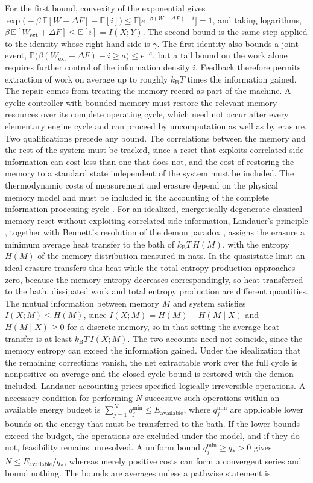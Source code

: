 \documentclass[11pt]{article}
\theoremstyle{definition}
\theoremstyle{remark}
\newcommand{\E}{\mathbb{E}}
\renewcommand{\Pr}{\mathbb{P}}
\newcommand{\kB}{k_{\mathrm B}}
\begin{document}
For the first bound, convexity of the exponential gives $\exp\big(-\beta\,\E[W - \Delta F] - \E[i]\big) \le \E\big[e^{-\beta (W - \Delta F) - i}\big] = 1$, and taking logarithms, $\beta\,\E[W_{\mathrm{ext}} + \Delta F] \le \E[i] = I(X;Y)$. The second bound is the same step applied to the identity whose right-hand side is $\gamma$. The first identity also bounds a joint event, $\Pr\big(\beta (W_{\mathrm{ext}} + \Delta F) - i \ge a\big) \le e^{-a}$, but a tail bound on the work alone requires further control of the information density $i$. Feedback therefore permits extraction of work on average up to roughly $\kB T$ times the information gained. The repair comes from treating the memory record as part of the machine. A cyclic controller with bounded memory must restore the relevant memory resources over its complete operating cycle, which need not occur after every elementary engine cycle and can proceed by uncomputation as well as by erasure. Two qualifications precede any bound. The correlations between the memory and the rest of the system must be tracked, since a reset that exploits correlated side information can cost less than one that does not, and the cost of restoring the memory to a standard state independent of the system must be included. The thermodynamic costs of measurement and erasure depend on the physical memory model and must be included in the accounting of the complete information-processing cycle \cite{sagawa2009}. For an idealized, energetically degenerate classical memory reset without exploiting correlated side information, Landauer's principle \cite{landauer1961}, together with Bennett's resolution of the demon paradox \cite{bennett1982}, assigns the erasure a minimum average heat transfer to the bath of $\kB T\, H(M)$, with the entropy $H(M)$ of the memory distribution measured in nats. In the quasistatic limit an ideal erasure transfers this heat while the total entropy production approaches zero, because the memory entropy decreases correspondingly, so heat transferred to the bath, dissipated work and total entropy production are different quantities. The mutual information between memory $M$ and system satisfies $I(X;M) \le H(M)$, since $I(X;M) = H(M) - H(M \mid X)$ and $H(M \mid X) \ge 0$ for a discrete memory, so in that setting the average heat transfer is at least $\kB T\, I(X;M)$. The two accounts need not coincide, since the memory entropy can exceed the information gained. Under the idealization that the remaining corrections vanish, the net extractable work over the full cycle is nonpositive on average and the closed-cycle bound is restored with the demon included. Landauer accounting prices specified logically irreversible operations. A necessary condition for performing $N$ successive such operations within an available energy budget is $\sum_{j=1}^{N} q_j^{\min} \le E_{\mathrm{available}}$, where $q_j^{\min}$ are applicable lower bounds on the energy that must be transferred to the bath. If the lower bounds exceed the budget, the operations are excluded under the model, and if they do not, feasibility remains unresolved. A uniform bound $q_j^{\min} \ge q_* > 0$ gives $N \le E_{\mathrm{available}}/q_*$, whereas merely positive costs can form a convergent series and bound nothing. The bounds are averages unless a pathwise statement is 
\end{document}
